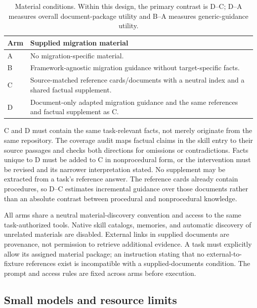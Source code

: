 \documentclass[11pt]{article}
\begin{document}
\begin{table}[t]
\centering
\small
\begin{tabular}{>{\raggedright\arraybackslash}p{}>{\raggedright\arraybackslash}p{}}
\hline
Arm & Supplied migration material\\
\hline
A & No migration-specific material.\\
B & Framework-agnostic migration guidance without target-specific facts.\\
C & Source-matched reference cards/documents with a neutral index and a shared factual supplement.\\
D & Document-only adapted migration guidance and the same references and factual supplement as C.\\
\hline
\end{tabular}
\caption{Material conditions. Within this design, the primary contrast is D--C; D--A measures overall document-package utility and B--A measures generic-guidance utility.}
\label{tab:conditions}
\end{table}

C and D must contain the same task-relevant facts, not merely originate from the same repository.
The coverage audit maps factual claims in the skill entry to their source passages and checks both directions for omissions or contradictions.
Facts unique to D must be added to C in nonprocedural form, or the intervention must be revised and its narrower interpretation stated.
No supplement may be extracted from a task's reference answer.
The reference cards already contain procedures, so D--C estimates incremental guidance over those documents rather than an absolute contrast between procedural and nonprocedural knowledge.

All arms share a neutral material-discovery convention and access to the same task-authorized tools.
Native skill catalogs, memories, and automatic discovery of unrelated materials are disabled.
External links in supplied documents are provenance, not permission to retrieve additional evidence.
A task must explicitly allow its assigned material package; an instruction stating that no external-to-fixture references exist is incompatible with a supplied-documents condition.
The prompt and access rules are fixed across arms before execution.

\subsection{Small models and resource limits}
\label{sec:models}
\label{sec:protocol}
\end{document}

